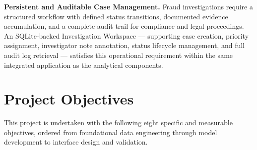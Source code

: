 \textbf{Persistent and Auditable Case Management.} Fraud investigations require a structured workflow with defined status transitions, documented evidence accumulation, and a complete audit trail for compliance and legal proceedings. An SQLite-backed Investigation Workspace --- supporting case creation, priority assignment, investigator note annotation, status lifecycle management, and full audit log retrieval --- satisfies this operational requirement within the same integrated application as the analytical components.

\section{Project Objectives}
\label{sec:objectives}

This project is undertaken with the following eight specific and measurable objectives, ordered from foundational data engineering through model development to interface design and validation.

